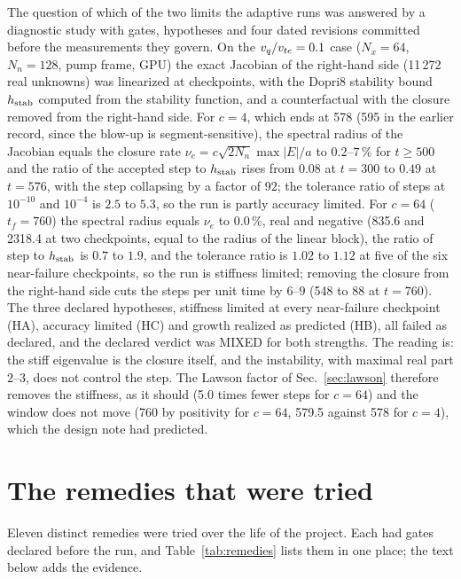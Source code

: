 The question of which of the two limits the adaptive runs was answered by a diagnostic study with gates, hypotheses and four dated revisions committed before the measurements they govern. On the $v_q/v_{te}=0.1$ case ($N_x=64$, $N_n=128$, pump frame, GPU) the exact Jacobian of the right-hand side (11\,272 real unknowns) was linearized at checkpoints, with the Dopri8 stability bound $h_{\rm stab}$ computed from the stability function, and a counterfactual with the closure removed from the right-hand side. For $c=4$, which ends at 578 (595 in the earlier record, since the blow-up is segment-sensitive), the spectral radius of the Jacobian equals the closure rate $\nu_e=c\sqrt{2N_n}\max|E|/a$ to $0.2$--$7\,\%$ for $t\ge500$ and the ratio of the accepted step to $h_{\rm stab}$ rises from $0.08$ at $t=300$ to $0.49$ at $t=576$, with the step collapsing by a factor of $92$; the tolerance ratio of steps at $10^{-10}$ and $10^{-4}$ is $2.5$ to $5.3$, so the run is partly accuracy limited. For $c=64$ ($t_f=760$) the spectral radius equals $\nu_e$ to $0.0\,\%$, real and negative (835.6 and 2318.4 at two checkpoints, equal to the radius of the linear block), the ratio of step to $h_{\rm stab}$ is $0.7$ to $1.9$, and the tolerance ratio is $1.02$ to $1.12$ at five of the six near-failure checkpoints, so the run is stiffness limited; removing the closure from the right-hand side cuts the steps per unit time by $6$--$9$ (548 to 88 at $t=760$). The three declared hypotheses, stiffness limited at every near-failure checkpoint (HA), accuracy limited (HC) and growth realized as predicted (HB), all failed as declared, and the declared verdict was MIXED for both strengths. The reading is: the stiff eigenvalue is the closure itself, and the instability, with maximal real part $2$--$3$, does not control the step. The Lawson factor of Sec.~\ref{sec:lawson} therefore removes the stiffness, as it should (5.0 times fewer steps for $c=64$) and the window does not move (760 by positivity for $c=64$, 579.5 against 578 for $c=4$), which the design note had predicted.

\section{The remedies that were tried}\label{sec:remedies}

Eleven distinct remedies were tried over the life of the project. Each had gates declared before the run, and Table~\ref{tab:remedies} lists them in one place; the text below adds the evidence.


